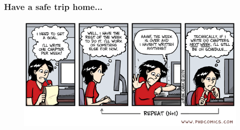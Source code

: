 \documentclass{beamer}
\begin{document}
\begin{frame}
 \frametitle{Have a safe trip home...}
  \begin{figure}[t]
  \includegraphics[width=\textwidth]{pics/phd011915s.png}
  \end{figure}

\end{frame}
\end{document}
